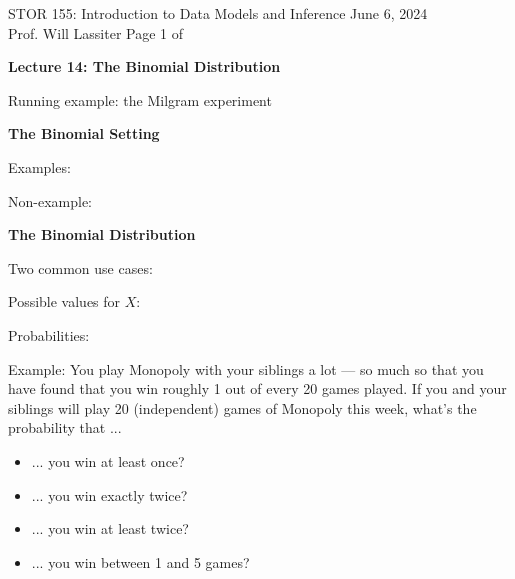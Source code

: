 \documentclass[11pt,letterpaper,twoside]{article}
\newcommand{\whatizit}{Lecture 14: The Binomial Distribution}
\begin{document}
\thispagestyle{empty} \vspace*{-0.75in}

{\bssten STOR 155: Introduction to Data Models and Inference \hfill June 6, 2024 \\
Prof. Will Lassiter  \hfill Page 1 of \pageref{totalpag}}
\vspace{10pt}
\begin{center} {{\Large \bf \whatizit}} \end{center}

Running example: the Milgram experiment \vspace{200pt}


{\bf The Binomial Setting} \vspace{200pt}

Examples: \vspace{100pt}

Non-example:

\newpage

{\bf The Binomial Distribution} \vspace{6pt}

Two common use cases: \vspace{120pt}

Possible values for $X$: \vspace{10pt}

Probabilities: \vspace{200pt}

Example: You play Monopoly with your siblings a lot --- so much so that you have found that you win roughly 1 out of every 20 games played.  If you and your siblings will play 20 (independent) games of Monopoly this week, what's the probability that ...

\begin{itemize}

\item ... you win at least once? \vspace{30pt}

\item ... you win exactly twice? \vspace{30pt}

\item ... you win at least twice? \vspace{30pt}

\item ... you win between 1 and 5 games?

\end{itemize}

\newpage
\end{document}
